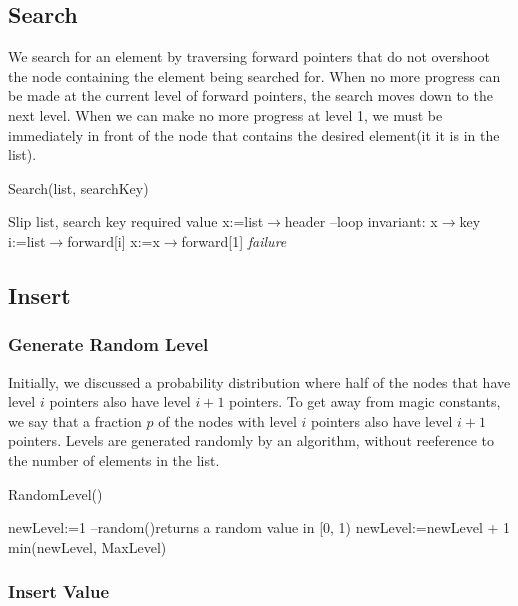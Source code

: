 \documentclass[10pt,english, openany]{book}
\begin{document}
\subsection{Search}
We search for an element by traversing forward pointers that do not overshoot the node containing the element being searched for. When no more progress can be made at the current level of forward pointers, the search moves down to the next level. When we can make no more progress at level 1, we must be immediately in front of the node that contains the desired element(it it is in the list).
\begin{algorithm}
\caption{Search(list, searchKey)}	
\begin{algorithmic}[1]
	 \Require Slip list, search key
	 \Ensure required value
	 \State x:=list$\rightarrow$header
	 \State --loop invariant: x$\rightarrow$key
	 \State i:=list$\rightarrow$forward[i]
	 \EndWhile
	 \EndFor
	 \State x:=x$\rightarrow$forward[1]
	 \State {} 
	 \EndIf
	 \State \Return \textit{failure}
\end{algorithmic}
\end{algorithm}

\subsection{Insert}
\subsubsection{Generate Random Level}
Initially, we discussed a probability distribution where half of the nodes that have level $i$ pointers also have level $i+1$ pointers. To get away from magic constants, we say that a fraction $p$ of the nodes with level $i$ pointers also have level $i+1$ pointers. Levels are generated randomly by an algorithm, without reeference to the number of elements in the list.
\begin{algorithm}[htb]
\caption{RandomLevel()}	
\begin{algorithmic}[1]
	 \Require
	 \Ensure
	 \State newLevel:=1
	 \State --random()returns a random value in [0, 1)
	 \State newLevel:=newLevel + 1
	 \EndWhile
	 \State \Return min(newLevel, MaxLevel)
\end{algorithmic}
\end{algorithm}
\subsubsection{Insert Value}
\end{document}

